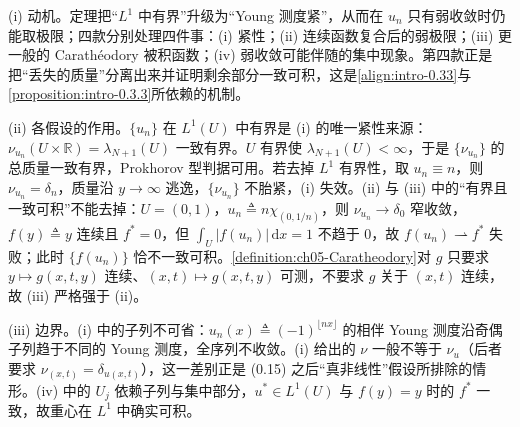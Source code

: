 \documentclass[../main.tex]{subfiles}
\begin{document}
\begin{remark}\label{remark:intro-0.2.2-动机}
(i) 动机。定理把“$L^1$ 中有界”升级为“Young 测度紧”，从而在 $u_n$ 只有弱收敛时仍能取极限；四款分别处理四件事：(i) 紧性；(ii) 连续函数复合后的弱极限；(iii) 更一般的 Carathéodory 被积函数；(iv) 弱收敛可能伴随的集中现象。第四款正是把“丢失的质量”分离出来并证明剩余部分一致可积，这是\eqref{align:intro-0.33}与\cref{proposition:intro-0.3.3}所依赖的机制。

(ii) 各假设的作用。$\{u_n\}$ 在 $L^1(U)$ 中有界是 (i) 的唯一紧性来源：$\nu_{u_n}(U\times\mathbb{R})=\lambda_{N+1}(U)$ 一致有界。$U$ 有界使 $\lambda_{N+1}(U)<\infty$，于是 $\{\nu_{u_n}\}$ 的总质量一致有界，Prokhorov 型判据可用。若去掉 $L^1$ 有界性，取 $u_n\equiv n$，则 $\nu_{u_n}=\delta_n$，质量沿 $y\to\infty$ 逃逸，$\{\nu_{u_n}\}$ 不胎紧，(i) 失效。(ii) 与 (iii) 中的“有界且一致可积”不能去掉：$U=(0,1)$，$u_n\triangleq n\chi_{(0,1/n)}$，则 $\nu_{u_n}\to\delta_0$ 窄收敛，$f(y)\triangleq y$ 连续且 $f^*=0$，但 $\int_U|f(u_n)|\,\mathrm{d}x=1$ 不趋于 $0$，故 $f(u_n)\rightharpoonup f^*$ 失败；此时 $\{f(u_n)\}$ 恰不一致可积。\cref{definition:ch05-Caratheodory}对 $g$ 只要求 $y\mapsto g(x,t,y)$ 连续、$(x,t)\mapsto g(x,t,y)$ 可测，不要求 $g$ 关于 $(x,t)$ 连续，故 (iii) 严格强于 (ii)。

(iii) 边界。(i) 中的子列不可省：$u_n(x)\triangleq(-1)^{\lfloor nx\rfloor}$ 的相伴 Young 测度沿奇偶子列趋于不同的 Young 测度，全序列不收敛。(i) 给出的 $\nu$ 一般不等于 $\nu_u$（后者要求 $\nu_{(x,t)}=\delta_{u(x,t)}$），这一差别正是 (0.15) 之后“真非线性”假设所排除的情形。(iv) 中的 $U_j$ 依赖子列与集中部分，$u^*\in L^1(U)$ 与 $f(y)=y$ 时的 $f^*$ 一致，故重心在 $L^1$ 中确实可积。
\end{remark}
\end{document}
